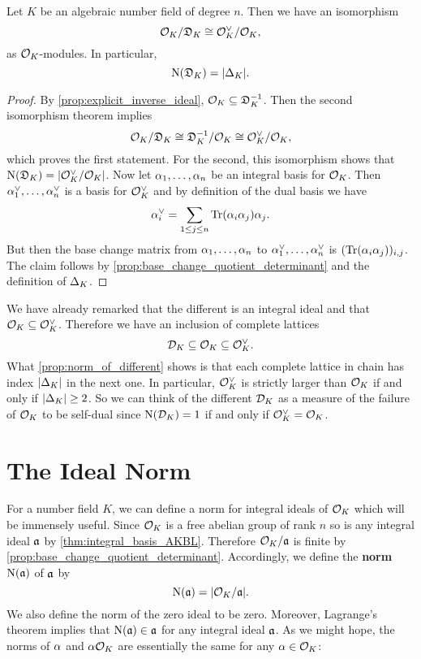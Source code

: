 \documentclass[12pt,oneside]{book}
\begin{document}
    \begin{proposition}\label{prop:norm_of_different}
      Let $K$ be an algebraic number field of degree $n$. Then we have an isomorphism
      \[
        \mathcal{O}_{K}/\mathfrak{D}_{K} \cong \mathcal{O}_{K}^{\vee}/\mathcal{O}_{K},
      \]
      as $\mathcal{O}_{K}$-modules. In particular,
      \[
        \operatorname{\mathrm{N}}(\mathfrak{D}_{K}) = |\Delta_{K}|.
      \]
    \end{proposition}
    \begin{proof}
      By \cref{prop:explicit_inverse_ideal}, $\mathcal{O}_{K} \subseteq \mathfrak{D}_{K}^{-1}$. Then the second isomorphism theorem implies
      \[
        \mathcal{O}_{K}/\mathfrak{D}_{K} \cong \mathfrak{D}^{-1}_{K}/\mathcal{O}_{K} \cong \mathcal{O}_{K}^{\vee}/\mathcal{O}_{K},
      \]
      which proves the first statement. For the second, this isomorphism shows that $\operatorname{\mathrm{N}}(\mathfrak{D}_{K}) = |\mathcal{O}_{K}^{\vee}/\mathcal{O}_{K}|$. Now let $\alpha_{1},\ldots,\alpha_{n}$ be an integral basis for $\mathcal{O}_{K}$. Then $\alpha_{1}^{\vee},\ldots,\alpha_{n}^{\vee}$ is a basis for $\mathcal{O}_{K}^{\vee}$ and by definition of the dual basis we have
      \[
        \alpha_{i}^{\vee} = \sum_{1 \le j \le n}\operatorname{\mathrm{Tr}}(\alpha_{i}\alpha_{j})\alpha_{j}.
      \]
      But then the base change matrix from $\alpha_{1},\ldots,\alpha_{n}$ to $\alpha_{1}^{\vee},\ldots,\alpha_{n}^{\vee}$ is $(\operatorname{\mathrm{Tr}}(\alpha_{i}\alpha_{j}))_{i,j}$. The claim follows by \cref{prop:base_change_quotient_determinant} and the definition of $\Delta_{K}$.
    \end{proof}

    We have already remarked that the different is an integral ideal and that $\mathcal{O}_{K} \subseteq \mathcal{O}_{K}^{\vee}$. Therefore we have an inclusion of complete lattices
    \[
      \mathcal{D}_{K} \subseteq \mathcal{O}_{K} \subseteq \mathcal{O}_{K}^{\vee}.
    \]
    What \cref{prop:norm_of_different} shows is that each complete lattice in chain has index $|\Delta_{K}|$ in the next one. In particular, $\mathcal{O}_{K}^{\vee}$ is strictly larger than $\mathcal{O}_{K}$ if and only if $|\Delta_{K}| \ge 2$. So we can think of the different $\mathcal{D}_{K}$ as a measure of the failure of $\mathcal{O}_{K}$ to be self-dual since $\operatorname{\mathrm{N}}(\mathcal{D}_{K}) = 1$ if and only if $\mathcal{O}_{K}^{\vee} = \mathcal{O}_{K}$.
  \section{The Ideal Norm}
    For a number field $K$, we can define a norm for integral ideals of $\mathcal{O}_{K}$ which will be immensely useful. Since $\mathcal{O}_{K}$ is a free abelian group of rank $n$ so is any integral ideal $\mathfrak{a}$ by \cref{thm:integral_basis_AKBL}. Therefore $\mathcal{O}_{K}/\mathfrak{a}$ is finite by \cref{prop:base_change_quotient_determinant}. Accordingly, we define the \textbf{norm} $\operatorname{\mathrm{N}}(\mathfrak{a})$ of $\mathfrak{a}$ by
    \[
      \operatorname{\mathrm{N}}(\mathfrak{a}) = |\mathcal{O}_{K}/\mathfrak{a}|.
    \]
    We also define the norm of the zero ideal to be zero. Moreover, Lagrange's theorem implies that $\operatorname{\mathrm{N}}(\mathfrak{a}) \in \mathfrak{a}$ for any integral ideal $\mathfrak{a}$. As we might hope, the norms of $\alpha$ and $\alpha\mathcal{O}_{K}$ are essentially the same for any $\alpha \in \mathcal{O}_{K}$:
    
\end{document}
